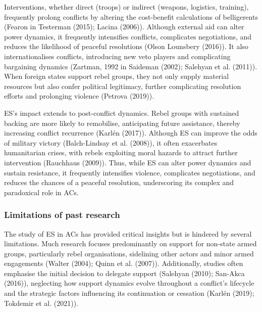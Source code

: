 \documentclass[
]{article}
\begin{document}
Interventions, whether direct (troops) or indirect (weapons, logistics,
training), frequently prolong conflicts by altering the cost-benefit
calculations of belligerents (Fearon in Testerman (2015); Lacina
(2006)). Although external aid can alter power dynamics, it frequently
intensifies conflicts, complicates negotiations, and reduces the
likelihood of peaceful resolutions (Olson Lounsbery (2016)). It also
internationalises conflicts, introducing new veto players and
complicating bargaining dynamics (Zartman, 1992 in Saideman (2002);
Salehyan et al. (2011)). When foreign states support rebel groups, they
not only supply material resources but also confer political legitimacy,
further complicating resolution efforts and prolonging violence (Petrova
(2019)).

ES's impact extends to post-conflict dynamics. Rebel groups with
sustained backing are more likely to remobilise, anticipating future
assistance, thereby increasing conflict recurrence (Karlén (2017)).
Although ES can improve the odds of military victory (Balch-Lindsay et
al. (2008)), it often exacerbates humanitarian crises, with rebels
exploiting moral hazards to attract further intervention (Rauchhaus
(2009)). Thus, while ES can alter power dynamics and sustain resistance,
it frequently intensifies violence, complicates negotiations, and
reduces the chances of a peaceful resolution, underscoring its complex
and paradoxical role in ACs.

\subsubsection{Limitations of past
research}\label{limitations-of-past-research}

The study of ES in ACs has provided critical insights but is hindered by
several limitations. Much research focuses predominantly on support for
non-state armed groups, particularly rebel organisations, sidelining
other actors and minor armed engagements (Walter (2004); Quinn et al.
(2007)). Additionally, studies often emphasise the initial decision to
delegate support (Salehyan (2010); San-Akca (2016)), neglecting how
support dynamics evolve throughout a conflict's lifecycle and the
strategic factors influencing its continuation or cessation (Karlén
(2019); Tokdemir et al. (2021)).
\end{document}
